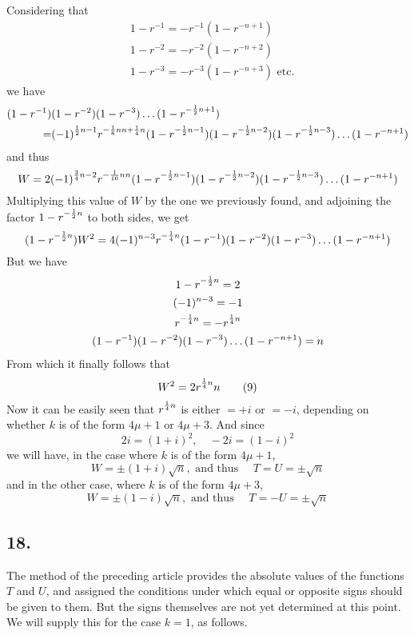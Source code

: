 \documentclass[twoside,12pt]{memoir}
\let\oldfrac\frac
\def\frac#1#2{\mathchoice{\tfrac{#1}{#2}}{\oldfrac{#1}{#2}}{\genfrac{}{}{}{2}{#1}{#2\mathstrut}}{\genfrac{}{}{}{3}{#1}{#2\mathstrut}}}
\begin{document}
Considering that
\[\begin{aligned}
& 1-r^{-1}=-r^{-1}(1-r^{-n+1}) \\
& 1-r^{-2}=-r^{-2}(1-r^{-n+2}) \\
& 1-r^{-3}=-r^{-3}(1-r^{-n+3}) \text{ etc{.}}
\end{aligned}\]
we have
\[\begin{aligned}
 (1-r^{-1})&(1-r^{-2})(1-r^{-3}) \ldots(1-r^{-\frac{1}{2} n+1}) \\
=&(-1)^{\frac{1}{2} n-1} r^{-\frac{1}{8} n n+\frac{1}{4} n}(1-r^{-\frac{1}{2} n-1})(1-r^{-\frac{1}{2} n-2})(1-r^{-\frac{1}{2} n-3}) \ldots(1-r^{-n+1})
\end{aligned}\]
and thus
\[W=2(-1)^{\frac{3}{4} n-2} r^{-\frac{1}{16} n n}(1-r^{-\frac{1}{2} n-1})(1-r^{-\frac{1}{2} n-2})(1-r^{-\frac{1}{2} n-3}) \ldots(1-r^{-n+1})\]
Multiplying this value of \(W\) by the one we previously found, and adjoining the factor \(1-r^{-\frac{1}{2} n}\) to both sides, we get
\[(1-r^{-\frac{1}{2} n}) W^{2}=4(-1)^{n-3} r^{-\frac{1}{4} n}(1-r^{-1})(1-r^{-2})(1-r^{-3}) \ldots(1-r^{-n+1})\]
But we have
\[\begin{gathered}
1-r^{-\frac{1}{2} n}=2 \\
(-1)^{n-3}=-1 \\
r^{-\frac{1}{4} n}=-r^{\frac{1}{4} n} \\
(1-r^{-1})(1-r^{-2})(1-r^{-3}) \ldots(1-r^{-n+1})=n
\end{gathered}\]
From which it finally follows that
\[ W^{2}=2 r^{\frac{1}{4} n} n \tag{9}\]
Now it can be easily seen that \(r^{\frac{1}{4} n}\) is either \(=+i\) or \(=-i\), depending on whether \(k\) is of the form \(4 \mu+1\) or \(4 \mu+3\). And since
\[2 i=(1+i)^{2}, \quad-2 i=(1-i)^{2}\]
we will have, in the case where \(k\) is of the form \(4 \mu+1\),
\[W= \pm(1+i) \sqrt{n}, \text{ and thus } \quad T=U= \pm \sqrt{n}\]
and in the other case, where \(k\) is of the form \(4 \mu+3\),
\[W= \pm(1-i) \sqrt{n}, \text{ and thus } \quad T=-U= \pm \sqrt{n}\]
%

\subsection*{18.}
 
The method of the preceding article provides the absolute values of the functions \(T\) and \(U\), and assigned the conditions under which equal or opposite signs should be given to them.  But the signs themselves are not yet determined at this point. We will supply this for the case \(k=1\), as follows.
 
\end{document}
